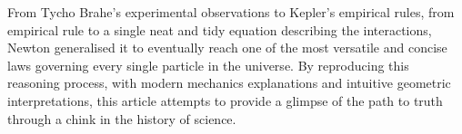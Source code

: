 \documentclass{article}
\begin{document}
From Tycho Brahe's experimental observations to Kepler's empirical rules, from empirical rule to a single neat and tidy equation describing the interactions, Newton generalised it to eventually reach one of the most versatile and concise laws governing every single particle in the universe. By reproducing this reasoning process, with modern mechanics explanations and intuitive geometric interpretations, this article attempts to provide a glimpse of the path to truth through a chink in the history of science.





\printbibliography
\end{document}
